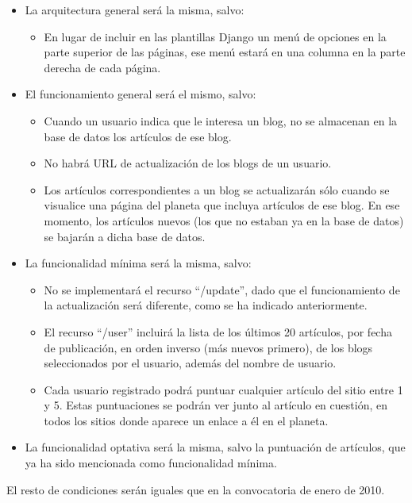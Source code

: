 \begin{itemize}
\item La arquitectura general será la misma, salvo:
  \begin{itemize}
  \item En lugar de incluir en las plantillas Django un menú de opciones en la parte superior de las páginas, ese menú estará en una columna en la parte derecha de cada página.
  \end{itemize}
\item El funcionamiento general será el mismo, salvo:
  \begin{itemize}
  \item Cuando un usuario indica que le interesa un blog, no se almacenan en la base de datos los artículos de ese blog.
  \item No habrá URL de actualización de los blogs de un usuario.
  \item Los artículos correspondientes a un blog se actualizarán sólo cuando se visualice una página del planeta que incluya artículos de ese blog. En ese momento, los artículos nuevos (los que no estaban ya en la base de datos) se bajarán a dicha base de datos.
  \end{itemize}
\item La funcionalidad mínima será la misma, salvo:
  \begin{itemize}
  \item No se implementará el recurso ``/update'', dado que el funcionamiento de la actualización será diferente, como se ha indicado anteriormente.
  \item El recurso ``/user'' incluirá la lista de los últimos 20 artículos, por fecha de publicación, en orden inverso (más nuevos primero), de los blogs seleccionados por el usuario, además del nombre de usuario.
  \item Cada usuario registrado podrá puntuar cualquier artículo del sitio entre 1 y 5. Estas puntuaciones se podrán ver junto al artículo en cuestión, en todos los sitios donde aparece un enlace a él en el planeta.
  \end{itemize}
\item La funcionalidad optativa será la misma, salvo la puntuación de artículos, que ya ha sido mencionada como funcionalidad mínima.
\end{itemize}

El resto de condiciones serán iguales que en la convocatoria de enero de 2010.

